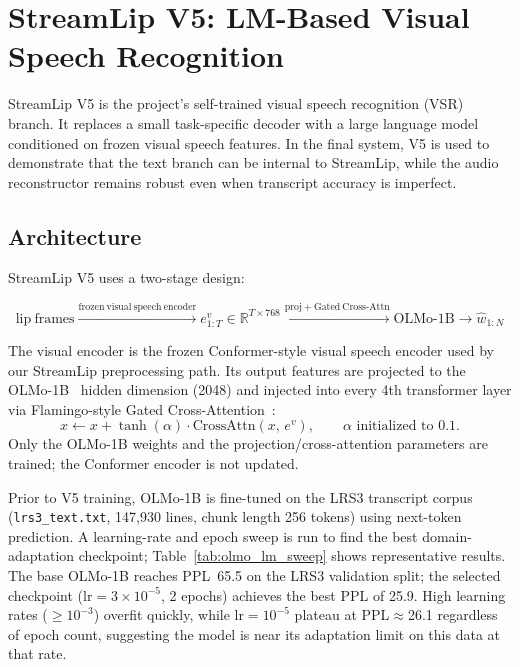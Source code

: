 \documentclass{article}
\begin{document}
\section{StreamLip V5: LM-Based Visual Speech Recognition}

StreamLip V5 is the project's self-trained visual speech recognition (VSR)
branch. It replaces a small task-specific decoder with a large language model
conditioned on frozen visual speech features. In the final system, V5 is used
to demonstrate that the text branch can be internal to StreamLip, while the
audio reconstructor remains robust even when transcript accuracy is imperfect.

\subsection{Architecture}

StreamLip V5 uses a two-stage design:

\begin{equation}
    \mathrm{lip\ frames}
    \xrightarrow{\mathrm{frozen\ visual\ speech\ encoder}}
    e^v_{1:T} \in \mathbb{R}^{T \times 768}
    \xrightarrow{\mathrm{proj} + \mathrm{Gated\ Cross\mbox{-}Attn}}
    \mathrm{OLMo\mbox{-}1B}
    \longrightarrow \hat{w}_{1:N}
\end{equation}

The visual encoder is the frozen Conformer-style visual speech encoder used by
our StreamLip preprocessing path. Its output features are projected to the
OLMo-1B~\cite{groeneveld2024olmo} hidden dimension (2048) and injected into every 4th transformer layer
via Flamingo-style Gated Cross-Attention~\cite{alayrac2022flamingo}:
\begin{equation}
    x \leftarrow x + \tanh(\alpha) \cdot \mathrm{CrossAttn}(x,\, e^v),
    \qquad \alpha \text{ initialized to } 0.1.
\end{equation}
Only the OLMo-1B weights and the projection/cross-attention parameters are
trained; the Conformer encoder is not updated.

Prior to V5 training, OLMo-1B is fine-tuned on the LRS3 transcript corpus
(\texttt{lrs3\_text.txt}, 147,930 lines, chunk length 256 tokens) using
next-token prediction.
A learning-rate and epoch sweep is run to find the best domain-adaptation
checkpoint; Table~\ref{tab:olmo_lm_sweep} shows representative results.
The base OLMo-1B reaches PPL~65.5 on the LRS3 validation split; the
selected checkpoint ($\text{lr}=3\times10^{-5}$, 2 epochs) achieves the
best PPL of 25.9.
High learning rates ($\geq10^{-3}$) overfit quickly, while $\text{lr}=10^{-5}$
plateau at PPL$\approx$26.1 regardless of epoch count, suggesting the model
is near its adaptation limit on this data at that rate.
\end{document}
